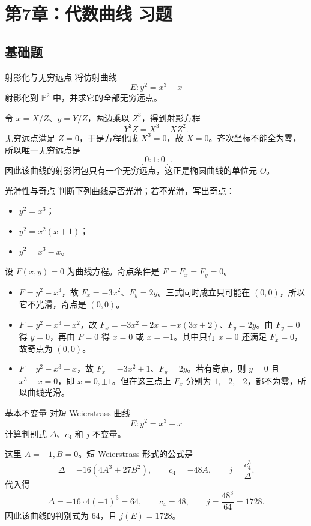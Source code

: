 \chapter{第7章：代数曲线 习题}
\difficultykey

\section{基础题 \easy}

\begin{problem}{射影化与无穷远点}
\easy
将仿射曲线
\[
E: y^2=x^3-x
\]
射影化到 $\mathbb{P}^2$ 中，并求它的全部无穷远点。
\end{problem}
\begin{solution}
令 $x=X/Z$、$y=Y/Z$，两边乘以 $Z^3$，得到射影方程
\[
Y^2Z=X^3-XZ^2.
\]
无穷远点满足 $Z=0$，于是方程化成 $X^3=0$，故 $X=0$。齐次坐标不能全为零，所以唯一无穷远点是
\[
[0:1:0].
\]
因此该曲线的射影闭包只有一个无穷远点，这正是椭圆曲线的单位元 $O$。
\end{solution}

\begin{problem}{光滑性与奇点}
\easy
判断下列曲线是否光滑；若不光滑，写出奇点：
\begin{itemize}
  \item[(i)] $y^2=x^3$；
  \item[(ii)] $y^2=x^2(x+1)$；
  \item[(iii)] $y^2=x^3-x$。
\end{itemize}
\end{problem}
\begin{solution}
设 $F(x,y)=0$ 为曲线方程。奇点条件是 $F=F_x=F_y=0$。
\begin{itemize}
  \item[(i)] $F=y^2-x^3$，故 $F_x=-3x^2$、$F_y=2y$。三式同时成立只可能在 $(0,0)$，所以它不光滑，奇点是 $(0,0)$。
  \item[(ii)] $F=y^2-x^3-x^2$，故 $F_x=-3x^2-2x=-x(3x+2)$、$F_y=2y$。由 $F_y=0$ 得 $y=0$，再由 $F=0$ 得 $x=0$ 或 $x=-1$。其中只有 $x=0$ 还满足 $F_x=0$，故奇点为 $(0,0)$。
  \item[(iii)] $F=y^2-x^3+x$，故 $F_x=-3x^2+1$、$F_y=2y$。若有奇点，则 $y=0$ 且 $x^3-x=0$，即 $x=0,\pm1$。但在这三点上 $F_x$ 分别为 $1,-2,-2$，都不为零，所以曲线光滑。
\end{itemize}
\end{solution}

\begin{problem}{基本不变量}
\easy
对短 Weierstrass 曲线
\[
E: y^2=x^3-x
\]
计算判别式 $\Delta$、$c_4$ 和 $j$-不变量。
\end{problem}
\begin{solution}
这里 $A=-1,B=0$。短 Weierstrass 形式的公式是
\[
\Delta=-16(4A^3+27B^2),\qquad c_4=-48A,\qquad j=\frac{c_4^3}{\Delta}.
\]
代入得
\[
\Delta=-16\cdot 4(-1)^3=64,
\qquad
c_4=48,
\qquad
j=\frac{48^3}{64}=1728.
\]
因此该曲线的判别式为 $64$，且 $j(E)=1728$。
\end{solution}

